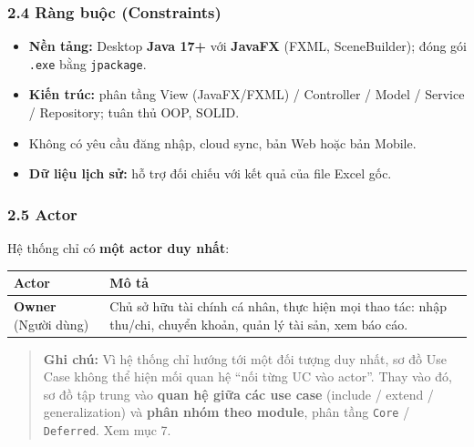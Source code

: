 \documentclass[11pt,a4paper]{article}
\newcounter{none}
\providecommand{\tightlist}{%
  \setlength{\itemsep}{0pt}\setlength{\parskip}{0pt}}
\begin{document}
\subsubsection{2.4 Ràng buộc (Constraints)}\label{ruxe0ng-buux1ed9c-constraints}

\begin{itemize}
\tightlist
\item
  \textbf{Nền tảng:} Desktop \textbf{Java 17+} với \textbf{JavaFX}
  (FXML, SceneBuilder); đóng gói \texttt{.exe} bằng \texttt{jpackage}.
\item
  \textbf{Kiến trúc:} phân tầng View (JavaFX/FXML) / Controller / Model
  / Service / Repository; tuân thủ OOP, SOLID.
\item
  Không có yêu cầu đăng nhập, cloud sync, bản Web hoặc bản
  Mobile.
\item
  \textbf{Dữ liệu lịch sử:} hỗ trợ đối chiếu với kết quả của file Excel
  gốc.
\end{itemize}

\subsubsection{2.5 Actor}\label{actor}

Hệ thống chỉ có \textbf{một actor duy nhất}:

{\def\LTcaptype{none}
\begin{longtable}[]{@{}
  >{\raggedright\arraybackslash}p{}
  >{\raggedright\arraybackslash}p{}@{}}
\toprule\noalign{}
\begin{minipage}[b]{\linewidth}\raggedright
Actor
\end{minipage} & \begin{minipage}[b]{\linewidth}\raggedright
Mô tả
\end{minipage} \\
\midrule\noalign{}
\endhead
\bottomrule\noalign{}
\endlastfoot
\textbf{Owner} (Người dùng) & Chủ sở hữu tài chính cá nhân, thực hiện
mọi thao tác: nhập thu/chi, chuyển khoản, quản lý tài sản, xem báo
cáo. \\
\end{longtable}
}

\begin{quote}
\textbf{Ghi chú:} Vì hệ thống chỉ hướng tới một đối tượng duy nhất, sơ
đồ Use Case không thể hiện mối quan hệ ``nối từng UC vào actor''. Thay
vào đó, sơ đồ tập trung vào \textbf{quan hệ giữa các use case} (include
/ extend / generalization) và \textbf{phân nhóm theo module}, phân tầng
\texttt{Core} / \texttt{Deferred}. Xem mục 7.
\end{quote}
\end{document}
